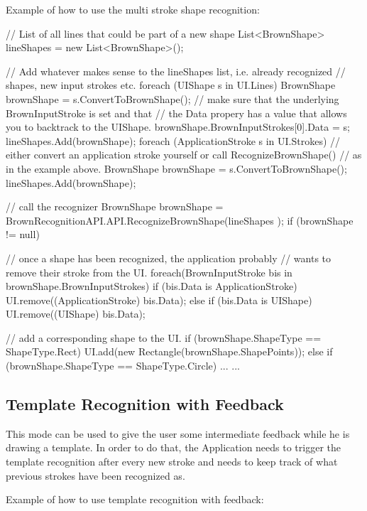 \par
 \-Example of how to use the multi stroke shape recognition\-: 
\begin{DoxyCode}
 // List of all lines that could be part of a new shape
 List<BrownShape> lineShapes = new List<BrownShape>();
 
 // Add whatever makes sense to the lineShapes list, i.e. already recognized
 // shapes, new input strokes etc. 
 foreach (UIShape s in UI.Lines) {
     BrownShape brownShape = s.ConvertToBrownShape();
     // make sure that the underlying BrownInputStroke is set and that 
     // the Data propery has a value that allows you to backtrack to the
       UIShape. 
     brownShape.BrownInputStrokes[0].Data = s;
     lineShapes.Add(brownShape);
 }
 foreach (ApplicationStroke s in UI.Strokes) {
     // either convert an application stroke yourself or call
       RecognizeBrownShape()
     // as in the example above.
     BrownShape brownShape = s.ConvertToBrownShape();
     lineShapes.Add(brownShape);
 }
 
 // call the recognizer
 BrownShape brownShape = BrownRecognitionAPI.API.RecognizeBrownShape(lineShapes
      );
 if (brownShape != null) {
     // once a shape has been recognized, the application probably
     // wants to remove their stroke from the UI.
     foreach(BrownInputStroke bis in brownShape.BrownInputStrokes) {
         if (bis.Data is ApplicationStroke) {
             UI.remove((ApplicationStroke) bis.Data);
         }
         else if (bis.Data is UIShape) {
             UI.remove((UIShape) bis.Data);
         }
     }
     
     // add a corresponding shape to the UI.
     if (brownShape.ShapeType == ShapeType.Rect) {
         UI.add(new Rectangle(brownShape.ShapePoints));
     }
     else if (brownShape.ShapeType == ShapeType.Circle) {
         ...
     }
     ...
 }
\end{DoxyCode}
\hypertarget{index_ab}{}\subsection{\-Template Recognition with Feedback}\label{index_ab}
\-This mode can be used to give the user some intermediate feedback while he is drawing a template. \-In order to do that, the \-Application needs to trigger the template recognition after every new stroke and needs to keep track of what previous strokes have been recognized as. \par
 \par
 \-Example of how to use template recognition with feedback\-: 
